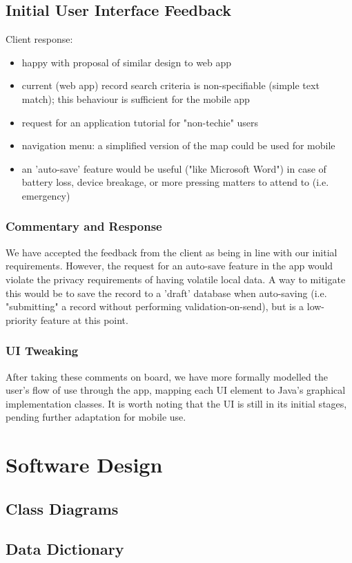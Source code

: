 \documentclass[12pt,a4paper,oneside,titlepage]{article}
\begin{document}
\subsection{Initial User Interface Feedback}
Client response:
\begin{itemize}
	\item happy with proposal of similar design to web app
	\item current (web app) record search criteria is non-specifiable (simple text match); this behaviour is sufficient for the mobile app
	\item request for an application tutorial for "non-techie" users
	\item navigation menu: a simplified version of the map could be used for mobile
	\item an 'auto-save' feature would be useful ("like Microsoft Word") in case of battery loss, device breakage, or more pressing matters to attend to (i.e. emergency)
\end{itemize}
\subsubsection{Commentary and Response}
We have accepted the feedback from the client as being in line with our initial requirements. However, the request for an auto-save feature in the app would violate the privacy requirements of having volatile local data. A way to mitigate this would be to save the record to a 'draft' database when auto-saving (i.e. "submitting" a record without performing validation-on-send), but is a low-priority feature at this point.
\subsubsection{UI Tweaking}
After taking these comments on board, we have more formally modelled the user's flow of use through the app, mapping each UI element to Java's graphical implementation classes. It is worth noting that the UI is still in its initial stages, pending further adaptation for mobile use.

\newpage
\section{Software Design}
\subsection{Class Diagrams}
\subsection{Data Dictionary}
\end{document}
